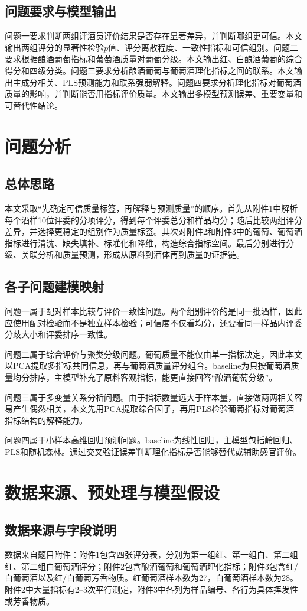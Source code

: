 \documentclass[UTF8,a4paper,12pt]{ctexart}
\begin{document}
\subsection{问题要求与模型输出}
问题一要求判断两组评酒员评价结果是否存在显著差异，并判断哪组更可信。本文输出两组评分的显著性检验$p$值、评分离散程度、一致性指标和可信组别。问题二要求根据酿酒葡萄指标和葡萄酒质量对葡萄分级。本文输出红、白酿酒葡萄的综合得分和四级分类。问题三要求分析酿酒葡萄与葡萄酒理化指标之间的联系。本文输出主成分相关、PLS预测能力和联系强弱解释。问题四要求分析理化指标对葡萄酒质量的影响，并判断能否用指标评价质量。本文输出多模型预测误差、重要变量和可替代性结论。
\section{问题分析}
\subsection{总体思路}
本文采取“先确定可信质量标签，再解释与预测质量”的顺序。首先从附件1中解析每个酒样10位评委的分项评分，得到每个评委总分和样品均分；随后比较两组评分差异，并选择更稳定的组别作为质量标签。其次对附件2和附件3中的葡萄、葡萄酒指标进行清洗、缺失填补、标准化和降维，构造综合指标空间。最后分别进行分级、关联分析和质量预测，形成从原料到酒体再到质量的证据链。
\subsection{各子问题建模映射}
问题一属于配对样本比较与评价一致性问题。两个组别评价的是同一批酒样，因此应使用配对检验而不是独立样本检验；可信度不仅看均分，还要看同一样品内评委分歧大小和评委排序一致性。

问题二属于综合评价与聚类分级问题。葡萄质量不能仅由单一指标决定，因此本文以PCA提取多指标共同信息，再与葡萄酒质量评分组合。baseline为只按葡萄酒质量均分排序，主模型补充了原料客观指标，能更直接回答“酿酒葡萄分级”。

问题三属于多变量关系分析问题。由于指标数量远大于样本量，直接做两两相关容易产生偶然相关，本文先用PCA提取综合因子，再用PLS检验葡萄指标对葡萄酒指标结构的解释能力。

问题四属于小样本高维回归预测问题。baseline为线性回归，主模型包括岭回归、PLS和随机森林。通过交叉验证误差判断理化指标是否能够替代或辅助感官评价。
\section{数据来源、预处理与模型假设}
\subsection{数据来源与字段说明}
数据来自题目附件：附件1包含四张评分表，分别为第一组红、第一组白、第二组红、第二组白葡萄酒评分；附件2包含酿酒葡萄和葡萄酒理化指标；附件3包含红/白葡萄酒以及红/白葡萄芳香物质。红葡萄酒样本数为27，白葡萄酒样本数为28。附件2中大量指标有2--3次平行测定，附件3中各列为样品编号、各行为具体挥发性或芳香物质。
\end{document}
